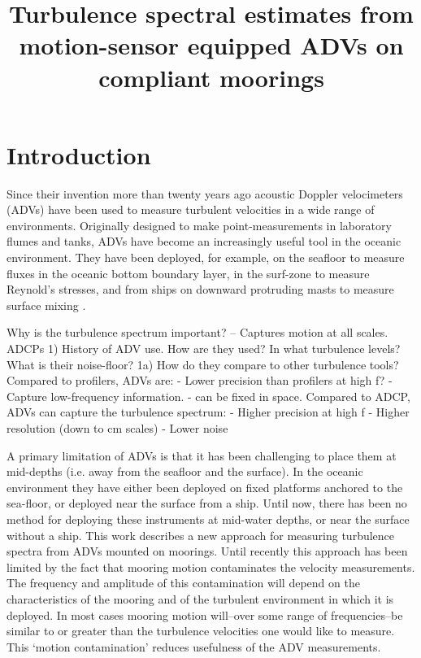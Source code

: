 \documentclass[twocol]{ametsoc}
\title{Turbulence spectral estimates from motion-sensor equipped ADVs on compliant moorings}
\affiliation{}
\begin{document}
\maketitle


\section{Introduction}


Since their invention more than twenty years ago acoustic Doppler velocimeters (ADVs) have been used to measure turbulent velocities in a wide range of environments. Originally designed to make point-measurements in laboratory flumes and tanks, ADVs have become an increasingly useful tool in the oceanic environment. They have been deployed, for example, on the seafloor to measure fluxes in the oceanic bottom boundary layer, in the surf-zone to measure Reynold's stresses, and from ships on downward protruding masts to measure surface mixing \citep[e.g.]{Lohrmann++1994, Voulgaris+Trowbridge1998, Kim++2000, Trowbridge+Elgar2003, Elgar++2005, Geyer++2008}.

Why is the turbulence spectrum important? -- Captures motion at all scales.
ADCPs 
1) History of ADV use. How are they used? In what turbulence levels? What is their noise-floor? 
1a) How do they compare to other turbulence tools?
Compared to profilers, ADVs are:
  - Lower precision than profilers at high f?
  - Capture low-frequency information.
  - can be fixed in space.
Compared to ADCP, ADVs can capture the turbulence spectrum:
  - Higher precision at high f
  - Higher resolution (down to cm scales)
  - Lower noise

A primary limitation of ADVs is that it has been challenging to place them at mid-depths (i.e. away from the seafloor and the surface). In the oceanic environment they have either been deployed on fixed platforms anchored to the sea-floor, or deployed near the surface from a ship.  Until now, there has been no method for deploying these instruments at mid-water depths, or near the surface without a ship.  This work describes a new approach for measuring turbulence spectra from ADVs mounted on moorings. Until recently this approach has been limited by the fact that mooring motion contaminates the velocity measurements.  The frequency and amplitude of this contamination will depend on the characteristics of the mooring and of the turbulent environment in which it is deployed. In most cases mooring motion will--over some range of frequencies--be similar to or greater than the turbulence velocities one would like to measure. This `motion contamination' reduces usefulness of the ADV measurements. 
\end{document}
